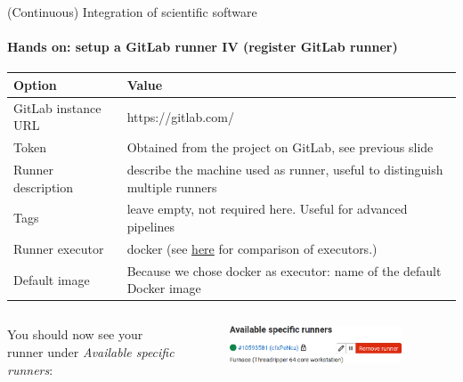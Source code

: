 \begin{frame}{(Continuous) Integration of scientific software}
    \framesubtitle{Hands on: setup a GitLab runner IV (register GitLab runner)}
    \begin{table}
        \begin{tabularx}{\textwidth}{l|X}
            \textbf{Option}              & \textbf{Value} \\
            \hline
            GitLab instance URL & https://gitlab.com/ \\
            Token               & Obtained from the project on GitLab, see previous slide \\
            Runner description  & describe the machine used as runner, useful to distinguish multiple runners \\
            Tags                & leave empty, not required here. Useful for advanced pipelines \\
            Runner executor     & docker (see \href{https://docs.gitlab.com/runner/executors/}{here} for comparison of executors.)\\
            Default image       & Because we chose docker as executor: name of the default Docker image
        \end{tabularx}
    \end{table}
    \begin{columns}[t]
        \begin{column}{0.5\textwidth}
        You should now see your runner under \newline \emph{Available specific runners}:
        \end{column}

        \begin{column}{0.5\textwidth}
            \begin{figure}[T!]
                \includegraphics[width=0.9\textwidth]{figures/runner-registered.png}
            \end{figure}
        \end{column}
    \end{columns}
\end{frame}


